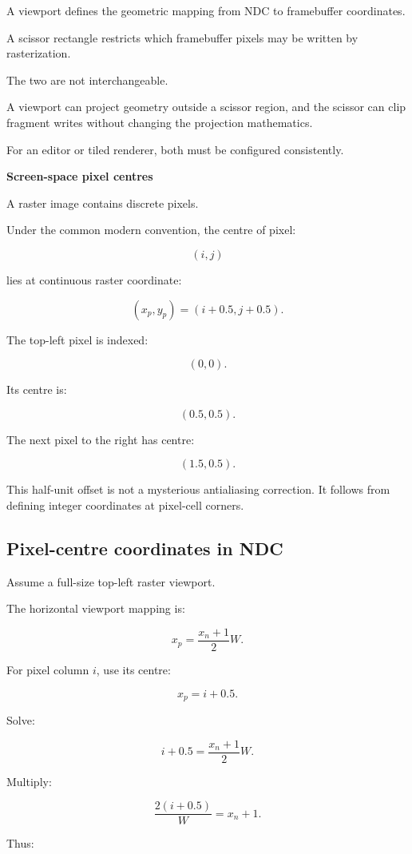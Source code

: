A viewport defines the geometric mapping from NDC to framebuffer coordinates.

A scissor rectangle restricts which framebuffer pixels may be written by rasterization.

The two are not interchangeable.

A viewport can project geometry outside a scissor region, and the scissor can clip fragment writes without changing the projection mathematics.

For an editor or tiled renderer, both must be configured consistently.

\textbf{Screen-space pixel centres}

A raster image contains discrete pixels.

Under the common modern convention, the centre of pixel:

\[
 (i,j)
\]

lies at continuous raster coordinate:

\[
 \boxed{ (x_p,y_p)=(i+0.5,j+0.5) }.
\]

The top-left pixel is indexed:

\[
 (0,0).
\]

Its centre is:

\[
 \boxed{(0.5,0.5)}.
\]

The next pixel to the right has centre:

\[
 (1.5,0.5).
\]

This half-unit offset is not a mysterious antialiasing correction. It follows from defining integer coordinates at pixel-cell corners.

\subsection{Pixel-centre coordinates in NDC}\label{02-foundations-ii-ch033-pixel-centre-coordinates-in-ndc}

Assume a full-size top-left raster viewport.

The horizontal viewport mapping is:

\[
 x_p=\frac{x_n+1}{2}W.
\]

For pixel column \(i\), use its centre:

\[
 x_p=i+0.5.
\]

Solve:

\[
 i+0.5=\frac{x_n+1}{2}W.
\]

Multiply:

\[
 \frac{2(i+0.5)}W=x_n+1.
\]

Thus:

